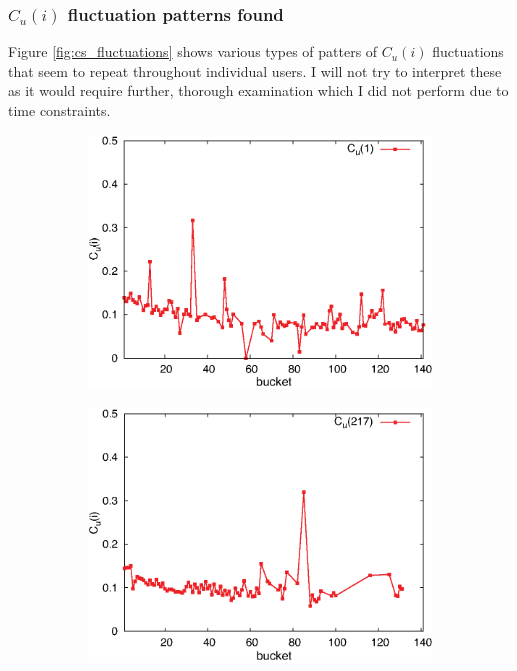     \subsubsection{$C_u(i)$ fluctuation patterns found} \label{sec:cs_fluctuations}
    
      Figure \ref{fig:cs_fluctuations} shows various types of patters of $C_u(i)$ fluctuations that seem to repeat throughout individual users. I will not try to interpret these as it would require further, thorough examination which I did not perform due to time constraints.
      
      \begin{figure}[H]
        \centering
        \begin{subfigure}[b]{0.32\textwidth}
          \centering
          \includegraphics[width=\textwidth]{chapters/03_implementation/u1}
        \end{subfigure}
        \begin{subfigure}[b]{0.32\textwidth}
          \centering
          \includegraphics[width=\textwidth]{chapters/03_implementation/u217}

\end{subfigure}
\end{figure}
